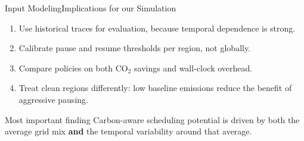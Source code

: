 \begin{frame}[t]{Input Modeling}{Implications for our Simulation}

  \begin{enumerate}
    \item Use historical traces for evaluation, because temporal
      dependence is strong.
    \item Calibrate pause and resume thresholds per region, not globally.
    \item Compare policies on both CO$_2$ savings and wall-clock overhead.
    \item Treat clean regions differently: low baseline emissions
      reduce the benefit of aggressive pausing.
  \end{enumerate}

  \vspace{0.35cm}
  \begin{block}{Most important finding}
    Carbon-aware scheduling potential is driven by both the average grid mix
    \textbf{and} the temporal variability around that average.
  \end{block}

\end{frame}
